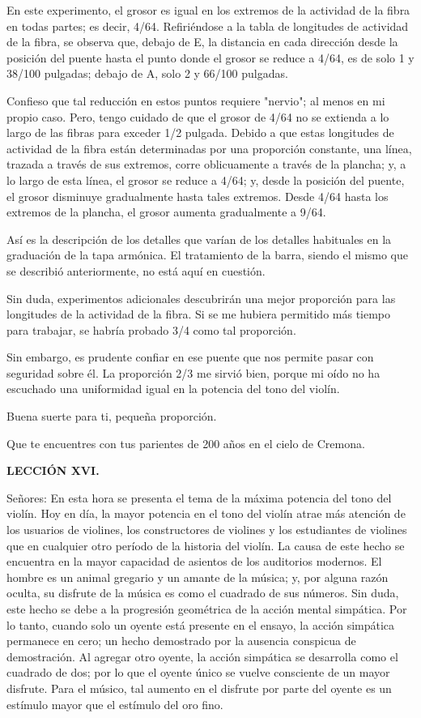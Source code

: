 \documentclass[12pt]{book}
\begin{document}
En este experimento, el grosor es igual en los extremos de la actividad de la fibra en todas partes; es decir, 4/64. Refiriéndose a la tabla de longitudes de actividad de la fibra, se observa que, debajo de E, la distancia en cada dirección desde la posición del puente hasta el punto donde el grosor se reduce a 4/64, es de solo 1 y 38/100 pulgadas; debajo de A, solo 2 y 66/100 pulgadas.

Confieso que tal reducción en estos puntos requiere "nervio"; al menos en mi propio caso. Pero, tengo cuidado de que el grosor de 4/64 no se extienda a lo largo de las fibras para exceder 1/2 pulgada. Debido a que estas longitudes de actividad de la fibra están determinadas por una proporción constante, una línea, trazada a través de sus extremos, corre oblicuamente a través de la plancha; y, a lo largo de esta línea, el grosor se reduce a 4/64; y, desde la posición del puente, el grosor disminuye gradualmente hasta tales extremos. Desde 4/64 hasta los extremos de la plancha, el grosor aumenta gradualmente a 9/64.

Así es la descripción de los detalles que varían de los detalles habituales en la graduación de la tapa armónica. El tratamiento de la barra, siendo el mismo que se describió anteriormente, no está aquí en cuestión.

Sin duda, experimentos adicionales descubrirán una mejor proporción para las longitudes de la actividad de la fibra. Si se me hubiera permitido más tiempo para trabajar, se habría probado 3/4 como tal proporción.

Sin embargo, es prudente confiar en ese puente que nos permite pasar con seguridad sobre él. La proporción 2/3 me sirvió bien, porque mi oído no ha escuchado una uniformidad igual en la potencia del tono del violín.

Buena suerte para ti, pequeña proporción.

Que te encuentres con tus parientes de 200 años en el cielo de Cremona.

\textbf{LECCIÓN XVI.}

Señores: En esta hora se presenta el tema de la máxima potencia del tono del violín. Hoy en día, la mayor potencia en el tono del violín atrae más atención de los usuarios de violines, los constructores de violines y los estudiantes de violines que en cualquier otro período de la historia del violín. La causa de este hecho se encuentra en la mayor capacidad de asientos de los auditorios modernos. El hombre es un animal gregario y un amante de la música; y, por alguna razón oculta, su disfrute de la música es como el cuadrado de sus números. Sin duda, este hecho se debe a la progresión geométrica de la acción mental simpática. Por lo tanto, cuando solo un oyente está presente en el ensayo, la acción simpática permanece en cero; un hecho demostrado por la ausencia conspicua de demostración. Al agregar otro oyente, la acción simpática se desarrolla como el cuadrado de dos; por lo que el oyente único se vuelve consciente de un mayor disfrute. Para el músico, tal aumento en el disfrute por parte del oyente es un estímulo mayor que el estímulo del oro fino.
\end{document}
